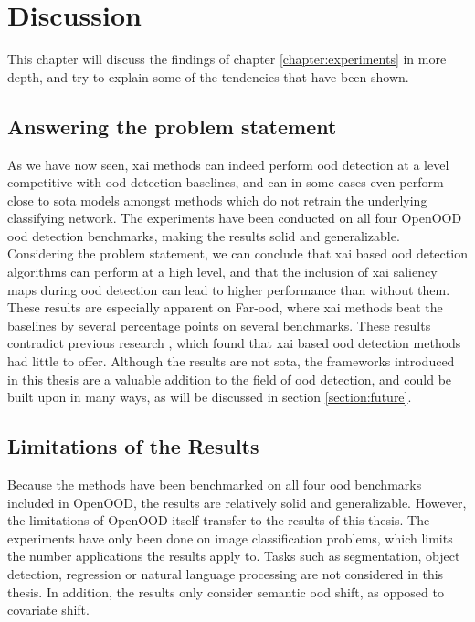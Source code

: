 \documentclass[UKenglish]{uiomasterthesis} %
\theoremstyle{definition}
\begin{document}
\chapter{Discussion} \label{chapter:discussion}

This chapter will discuss the findings of chapter \ref{chapter:experiments} in more depth, and try to explain some of the tendencies that have been shown.

\section{Answering the problem statement}

As we have now seen, \ac{xai} methods can indeed perform \ac{ood} detection at a level competitive with \ac{ood} detection baselines, and can in some cases even perform close to \ac{sota} models amongst methods which do not retrain the underlying classifying network. The experiments have been conducted on all four OpenOOD \ac{ood} detection benchmarks, making the results solid and generalizable. Considering the problem statement, we can conclude that \ac{xai} based \ac{ood} detection algorithms can perform at a high level, and that the inclusion of \ac{xai} saliency maps during \ac{ood} detection can lead to higher performance than without them. These results are especially apparent on Far-\ac{ood}, where \ac{xai} methods beat the baselines by several percentage points on several benchmarks. These results contradict previous research \cite{martinez}, which found that \ac{xai} based \ac{ood} detection methods had little to offer. Although the results are not \ac{sota}, the frameworks introduced in this thesis are a valuable addition to the field of \ac{ood} detection, and could be built upon in many ways, as will be discussed in section \ref{section:future}.

\section{Limitations of the Results}

Because the methods have been benchmarked on all four \ac{ood} benchmarks included in OpenOOD, the results are relatively solid and generalizable. However, the limitations of OpenOOD itself transfer to the results of this thesis. The experiments have only been done on image classification problems, which limits the number applications the results apply to. Tasks such as segmentation, object detection, regression or natural language processing are not considered in this thesis. In addition, the results only consider semantic \ac{ood} shift, as opposed to covariate shift.
\end{document}
